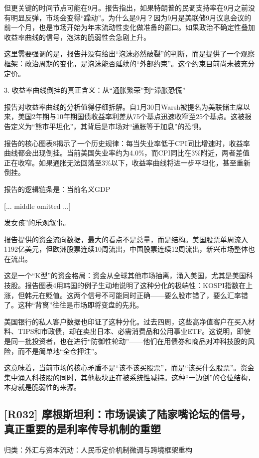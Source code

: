 \documentclass[11pt]{ctexart}
\begin{document}
但更关键的时间节点可能在9月。报告指出，如果特朗普的民调支持率在9月之前没有明显反弹，市场会变得“躁动”。为什么是9月？因为9月是美联储9月议息会议的前一个月，也是市场开始为年末流动性变化做准备的窗口。如果政治不确定性叠加收益率曲线的信号，泡沫的脆弱性会急剧上升。

这里需要强调的是，报告并没有给出“泡沫必然破裂”的判断，而是提供了一个观察框架：政治周期的变化，是泡沫能否延续的“外部约束”。这个约束目前尚未被充分定价。

3. 收益率曲线倒挂的真正含义：从“通胀繁荣”到“滞胀恐慌”

报告对收益率曲线的分析值得仔细拆解。自1月30日Warsh被提名为美联储主席以来，美国2年期与10年期国债收益率利差从75个基点迅速收窄至25个基点。这被报告定义为“熊市平坦化”，其背后是市场对“通胀等于加息”的恐惧。

报告的核心图表8揭示了一个历史规律：每当失业率低于CPI同比增速时，收益率曲线都会出现倒挂。当前美国失业率约为4.0\%，而CPI同比在3\%附近，两者差值正在收窄。如果通胀无法回落至3\%以下，收益率曲线将进一步平坦化，甚至重新倒挂。

报告的逻辑链条是：当前名义GDP

[... middle omitted ...]

发女孩”的乐观叙事。

报告提供的资金流向数据，最大的看点不是总量，而是结构。美国股票单周流入1192亿美元，但欧洲股票连续10周流出，中国股票连续12周流出，新兴市场整体也在流出。

这是一个“K型”的资金格局：资金从全球其他市场抽离，涌入美国，尤其是美国科技股。报告图表4用韩国的例子生动地说明了这种分化的极端性：KOSPI指数在上涨，但韩元在贬值。这两个信号不可能同时正确——要么股市错了，要么汇率错了。这种“背离”往往是市场即将变盘的先兆。

美国银行的私人客户数据也印证了这种分化。过去四周，这些高净值客户在买入材料、TIPS和市政债，却在卖出日本、必需消费品和公用事业ETF。这说明，即使是同一批投资者，也在进行“防御性轮动”——他们在用债券和商品对冲科技股的风险，而不是简单地“全仓押注”。

这意味着，当前市场的核心矛盾不是“该不该买股票”，而是“该买什么股票”。资金集中涌入科技股的同时，其他板块正在被系统性减持。这种“一边倒”的仓位结构，本身就是脆弱性的来源。

\subsection{[R032] 摩根斯坦利：市场误读了陆家嘴论坛的信号，真正重要的是利率传导机制的重塑}
{\small\color{refgray}归类：外汇与资本流动：人民币定价机制微调与跨境框架重构}
\end{document}
